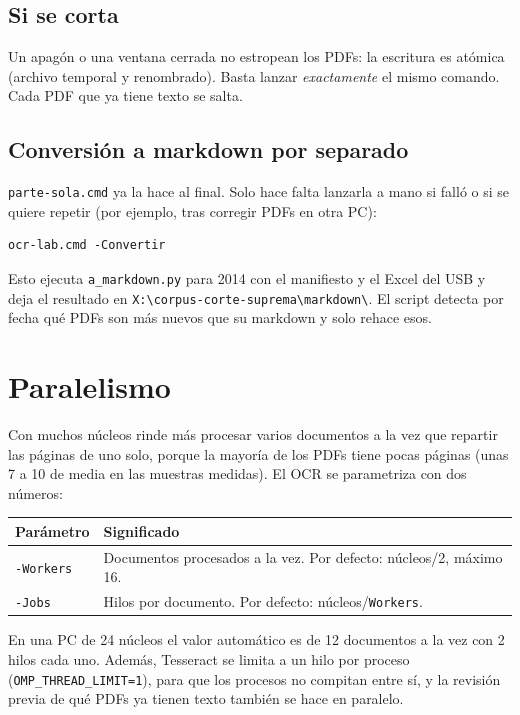 ﻿\documentclass[11pt,a4paper]{article}
\begin{document}
\subsection{Si se corta}

Un apagón o una ventana cerrada no estropean los PDFs: la escritura es atómica (archivo
temporal y renombrado). Basta lanzar \emph{exactamente} el mismo comando. Cada PDF que ya
tiene texto se salta.

\subsection{Conversión a markdown por separado}

\texttt{parte-sola.cmd} ya la hace al final. Solo hace falta lanzarla a mano si falló o
si se quiere repetir (por ejemplo, tras corregir PDFs en otra PC):
\begin{lstlisting}
ocr-lab.cmd -Convertir
\end{lstlisting}
Esto ejecuta \texttt{a\_markdown.py} para 2014 con el manifiesto y el Excel del USB y deja
el resultado en \texttt{X:\textbackslash corpus-corte-suprema\textbackslash markdown\textbackslash}.
El script detecta por fecha qué PDFs son más nuevos que su markdown y solo rehace esos.

\section{Paralelismo}\label{sec:paralelo}

Con muchos núcleos rinde más procesar varios documentos a la vez que repartir las
páginas de uno solo, porque la mayoría de los PDFs tiene pocas páginas (unas 7 a 10 de
media en las muestras medidas). El OCR se parametriza con dos números:

\begin{center}
\begin{tabular}{lp{9cm}}
\toprule
Parámetro & Significado \\
\midrule
\texttt{-Workers} & Documentos procesados a la vez. Por defecto: núcleos/2, máximo 16. \\
\texttt{-Jobs} & Hilos por documento. Por defecto: núcleos/\texttt{Workers}. \\
\bottomrule
\end{tabular}
\end{center}

En una PC de 24 núcleos el valor automático es de 12 documentos a la vez con 2 hilos cada
uno. Además, Tesseract se limita a un hilo por proceso (\texttt{OMP\_THREAD\_LIMIT=1}),
para que los procesos no compitan entre sí, y la revisión previa de qué PDFs ya tienen
texto también se hace en paralelo.
\end{document}
